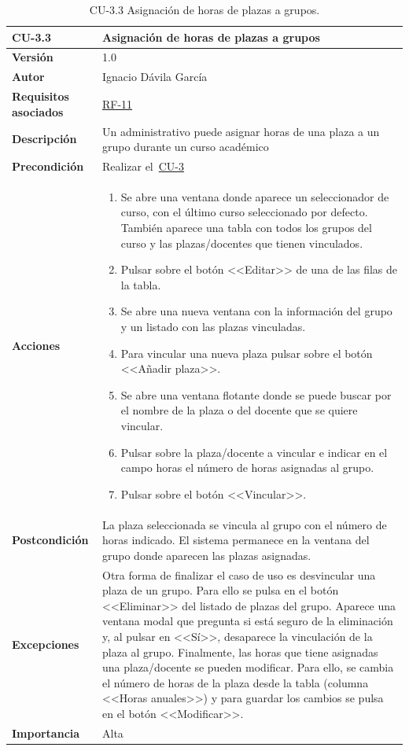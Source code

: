 \begin{table}[p]
\label{table:CU-3.3}
	\centering
	\begin{tabularx}{\linewidth}{ p{} p{} }
		\toprule
		\textbf{CU-3.3}    & \textbf{Asignación de horas de plazas a grupos}\\
		\toprule
		\textbf{Versión}              & 1.0    \\
		\textbf{Autor}                & Ignacio Dávila García \\
		\textbf{Requisitos asociados} & \hyperref[itm:RF11]{RF-11} \\
		\textbf{Descripción}          & Un administrativo puede asignar horas de una plaza a un grupo durante un curso académico \\
		\textbf{Precondición}         & Realizar el~\hyperref[table:CU-3]{CU-3} \\
		\textbf{Acciones}             &
		\begin{enumerate}
			\def\labelenumi{\arabic{enumi}.}
			\tightlist
			\item Se abre una ventana donde aparece un seleccionador de curso, con el último curso seleccionado por defecto. También aparece una tabla con todos los grupos del curso y las plazas/docentes que tienen vinculados.
			\item Pulsar sobre el botón <<Editar>> de una de las filas de la tabla.
			\item Se abre una nueva ventana con la información del grupo y un listado con las plazas vinculadas.
			\item Para vincular una nueva plaza pulsar sobre el botón <<Añadir plaza>>.
			\item Se abre una ventana flotante donde se puede buscar por el nombre de la plaza o del docente que se quiere vincular.
			\item Pulsar sobre la plaza/docente a vincular e indicar en el campo horas el número de horas asignadas al grupo.
			\item Pulsar sobre el botón <<Vincular>>.
		\end{enumerate}\\
		\textbf{Postcondición}        & La plaza seleccionada se vincula al grupo con el número de horas indicado. El sistema permanece en la ventana del grupo donde aparecen las plazas asignadas. \\
		\textbf{Excepciones}          & Otra forma de finalizar el caso de uso es desvincular una plaza de un grupo. Para ello se pulsa en el botón <<Eliminar>> del listado de plazas del grupo. Aparece una ventana modal que pregunta si está seguro de la eliminación y, al pulsar en <<Sí>>, desaparece la vinculación de la plaza al grupo.
		Finalmente, las horas que tiene asignadas una plaza/docente se pueden modificar. Para ello, se cambia el número de horas de la plaza desde la tabla (columna <<Horas anuales>>) y para guardar los cambios se pulsa en el botón <<Modificar>>. \\
		\textbf{Importancia}          & Alta \\
		\bottomrule
	\end{tabularx}
	\caption{CU-3.3 Asignación de horas de plazas a grupos.}
\end{table}
\FloatBarrier

